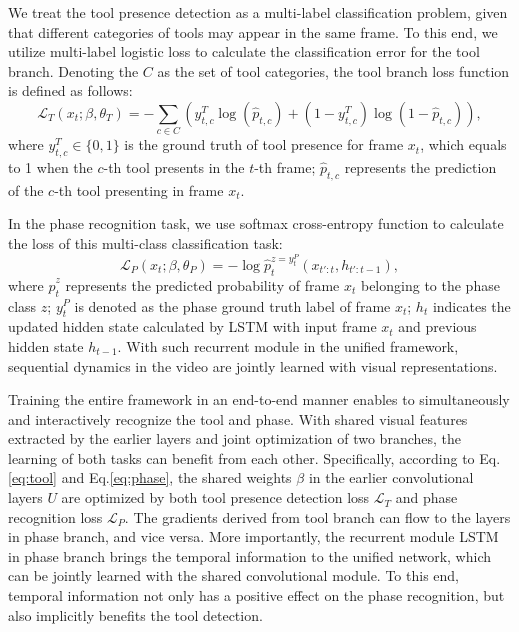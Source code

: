 \documentclass{elsarticle}
\begin{document}
We treat the tool presence detection as a multi-label classification problem, given that different categories of tools may appear in the same frame.
To this end, we utilize multi-label logistic loss to calculate the classification error for the tool branch.
Denoting the $C$ as the set of tool categories, the tool branch loss function is defined as follows:
\begin{equation} 
	\label{eq:tool}
	\mathcal{L}_{T}(x_t;\beta,\theta_T)= - \sum\limits_{c\in C} (y^T_{t,c} \log(\hat{p}_{t,c}) + (1 - y^T_{t,c}) \log(1 - \hat{p}_{t,c})), 
\end{equation}
where $y^T_{t,c} \! \in \! \{0,1\}$ is the ground truth of tool presence for frame $x_t$, which equals to 1 when the $c$-th tool presents in the $t$-th frame;
$\hat{p}_{t,c}$ represents the prediction of the $c$-th tool presenting in frame $x_t$.

In the phase recognition task, we use softmax cross-entropy function to calculate the loss of this multi-class classification task:
\begin{equation}
	\label{eq:phase}
	\mathcal{L}_{P} (x_t ;\beta, \theta_P) = -  \log \hat{p}_t^{z=y^P_t}(x_{t':t},h_{t':t-1} ),
\end{equation}
where $\hat{p}_t^z$ represents the predicted probability of frame $x_t$ belonging to the phase class $z$;
$y^P_t$ is denoted as the phase ground truth label of frame $x_t$;
$h_t$ indicates the updated hidden state calculated by LSTM with input frame $x_t$ and previous hidden state $h_{t-1}$.
With such recurrent module in the unified framework, sequential dynamics in the video are jointly learned with visual representations.

Training the entire framework in an end-to-end manner enables to simultaneously and interactively recognize the tool and phase.
With shared visual features extracted by the earlier layers and joint optimization of two branches, the learning of both tasks can benefit from each other.
Specifically, according to Eq.\ref{eq:tool} and Eq.\ref{eq:phase}, the shared weights $\beta$ in the earlier convolutional layers $U$ are optimized by both tool presence detection loss $\mathcal{L}_{T}$ and phase recognition loss $\mathcal{L}_{P}$.
The gradients derived from tool branch can flow to the layers in phase branch, and vice versa.
More importantly, the recurrent module LSTM in phase branch brings the temporal information to the unified network, which can be jointly learned with the shared convolutional module.
To this end, temporal information not only has a positive effect on the phase recognition, but also implicitly benefits the tool detection.
\end{document}
